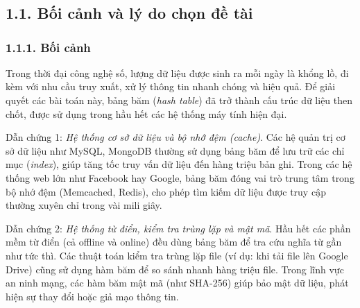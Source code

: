 \documentclass[12pt,a4paper]{report}
\begin{document}
\newpage
\chapter*{}
\vspace*{-7em}
\listoftables

\newpage
\chapter*{}
\listoffigures

\newpage
\chapter*{}

\section*{1.1. Bối cảnh và lý do chọn đề tài}
\subsection*{1.1.1. Bối cảnh}
\noindent \indent Trong thời đại công nghệ số, lượng dữ liệu được sinh ra mỗi ngày là khổng lồ, đi kèm với nhu cầu truy xuất, xử lý thông tin nhanh chóng và hiệu quả. Để giải quyết các bài toán này, bảng băm (\textit{hash table}) đã trở thành cấu trúc dữ liệu then chốt, được sử dụng trong hầu hết các hệ thống máy tính hiện đại.

Dẫn chứng 1: \textit{Hệ thống cơ sở dữ liệu và bộ nhớ đệm (\textit{cache})}.
Các hệ quản trị cơ sở dữ liệu như MySQL, MongoDB thường sử dụng bảng băm để lưu trữ các chỉ mục (\textit{index}), giúp tăng tốc truy vấn dữ liệu đến hàng triệu bản ghi. Trong các hệ thống web lớn như Facebook hay Google, bảng băm đóng vai trò trung tâm trong bộ nhớ đệm (Memcached, Redis), cho phép tìm kiếm dữ liệu được truy cập thường xuyên chỉ trong vài mili giây.

Dẫn chứng 2: \textit{Hệ thống từ điển, kiểm tra trùng lặp và mật mã}.
Hầu hết các phần mềm từ điển (cả offline và online) đều dùng bảng băm để tra cứu nghĩa từ gần như tức thì. Các thuật toán kiểm tra trùng lặp file (ví dụ: khi tải file lên Google Drive) cũng sử dụng hàm băm để so sánh nhanh hàng triệu file. Trong lĩnh vực an ninh mạng, các hàm băm mật mã (như SHA-256) giúp bảo mật dữ liệu, phát hiện sự thay đổi hoặc giả mạo thông tin.
\end{document}

